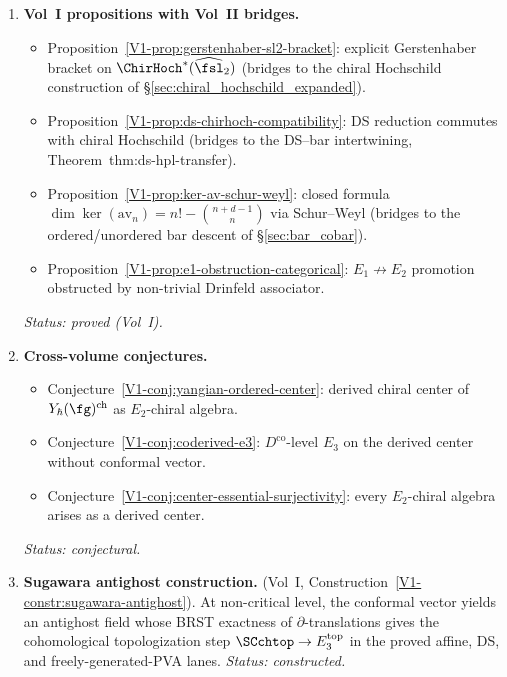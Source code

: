 \begin{enumerate}[resume]
\item \textbf{Vol~I propositions with Vol~II bridges.}
 \begin{itemize}
 \item Proposition~\ref*{V1-prop:gerstenhaber-sl2-bracket}:
 explicit Gerstenhaber bracket on
 $\ChirHoch^*(\widehat{\fsl}_2)$
 (bridges to the chiral Hochschild construction of
 \S\ref{sec:chiral_hochschild_expanded}).
 \item Proposition~\ref*{V1-prop:ds-chirhoch-compatibility}:
 DS reduction commutes with chiral Hochschild
 (bridges to the DS--bar intertwining,
 Theorem~\textup{thm:ds-hpl-transfer}).
 \item Proposition~\ref*{V1-prop:ker-av-schur-weyl}:
 closed formula $\dim\ker(\mathrm{av}_n)
 = n! - \binom{n{+}d{-}1}{n}$ via Schur--Weyl
 (bridges to the ordered/unordered bar descent
 of \S\ref{sec:bar_cobar}).
 \item Proposition~\ref*{V1-prop:e1-obstruction-categorical}:
 $E_1 \not\to E_2$ promotion obstructed by
 non-trivial Drinfeld associator.
 \end{itemize}
 \emph{Status: proved (Vol~I).}

\item \textbf{Cross-volume conjectures.}
 \begin{itemize}
 \item Conjecture~\ref*{V1-conj:yangian-ordered-center}:
 derived chiral center of $Y_\hbar(\fg)^{\mathrm{ch}}$
 as $E_2$-chiral algebra.
 \item Conjecture~\ref*{V1-conj:coderived-e3}:
 $D^{\mathrm{co}}$-level $E_3$ on the derived center
 without conformal vector.
 \item Conjecture~\ref*{V1-conj:center-essential-surjectivity}:
 every $E_2$-chiral algebra arises as a derived center.
 \end{itemize}
 \emph{Status: conjectural.}

\item \textbf{Sugawara antighost construction.}
 (Vol~I, Construction~\ref*{V1-constr:sugawara-antighost}).
 At non-critical level, the conformal vector yields an
 antighost field whose BRST exactness of $\partial$-translations
 gives the cohomological topologization step
 $\SCchtop \to E_3^{\mathrm{top}}$ in the proved affine, DS, and
 freely-generated-PVA lanes.
 \emph{Status: constructed.}
\end{enumerate}
